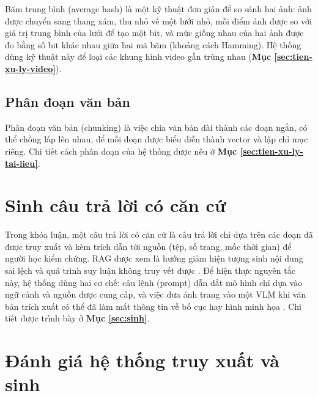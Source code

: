Băm trung bình (average hash) là một kỹ thuật đơn giản để so sánh hai ảnh: ảnh được chuyển sang thang xám, thu nhỏ về một lưới nhỏ, mỗi điểm ảnh được so với giá trị trung bình của lưới để tạo một bit, và mức giống nhau của hai ảnh được đo bằng số bit khác nhau giữa hai mã băm (khoảng cách Hamming). Hệ thống dùng kỹ thuật này để loại các khung hình video gần trùng nhau (\textbf{Mục \ref{sec:tien-xu-ly-video}}).

\subsection{Phân đoạn văn bản}

Phân đoạn văn bản (chunking) là việc chia văn bản dài thành các đoạn ngắn, có thể chồng lấp lên nhau, để mỗi đoạn được biểu diễn thành vector và lập chỉ mục riêng. Chi tiết cách phân đoạn của hệ thống được nêu ở \textbf{Mục \ref{sec:tien-xu-ly-tai-lieu}}.


\section{Sinh câu trả lời có căn cứ}

Trong khóa luận, một câu trả lời có căn cứ là câu trả lời chỉ dựa trên các đoạn đã được truy xuất và kèm trích dẫn tới nguồn (tệp, số trang, mốc thời gian) để người học kiểm chứng. RAG được xem là hướng giảm hiện tượng sinh nội dung sai lệch và quá trình suy luận không truy vết được \cite{gao2023ragsurvey}. Để hiện thực nguyên tắc này, hệ thống dùng hai cơ chế: câu lệnh (prompt) dẫn dắt mô hình chỉ dựa vào ngữ cảnh và nguồn được cung cấp, và việc đưa ảnh trang vào một VLM khi văn bản trích xuất có thể đã làm mất thông tin về bố cục hay hình minh họa \cite{yu2025visrag, bai2025qwen3vl}. Chi tiết được trình bày ở \textbf{Mục \ref{sec:sinh}}.


\section{Đánh giá hệ thống truy xuất và sinh}

